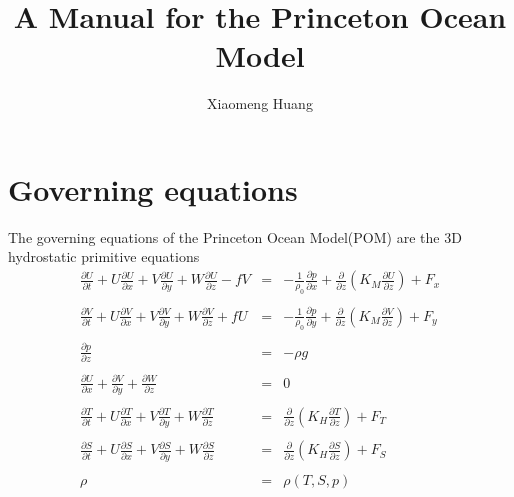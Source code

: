 \documentclass[oribibl]{llncs}
\begin{document}
\title{A Manual for the Princeton Ocean Model}
\author{Xiaomeng Huang}
\maketitle

\section{Governing equations}

The governing equations of the Princeton Ocean Model(POM) are the 3D hydrostatic primitive equations
\begin{eqnarray}
\frac{\partial U}{\partial t}+U\frac{\partial U}{\partial x}+V\frac{\partial U}{\partial y}+W\frac{\partial U}{\partial z} -fV &=& - \frac{1}{\rho_0} \frac{\partial p}{\partial x} + \frac{\partial}{\partial z}  \left ( K_M \frac{\partial U}{\partial z} \right) +F_x\\ \nonumber \\ 
\frac{\partial V}{\partial t}+U\frac{\partial V}{\partial x}+V\frac{\partial V}{\partial y}+W\frac{\partial V}{\partial z} +fU&=& - \frac{1}{\rho_0} \frac{\partial p}{\partial y} + \frac{\partial}{\partial z}  \left ( K_M \frac{\partial V}{\partial z} \right) +F_y\\ \nonumber \\ 
\frac{\partial p}{\partial z} &=& - \rho g \\ \nonumber \\ 
\frac{\partial U}{\partial x} + \frac{\partial V}{\partial y} + \frac{\partial W}{\partial z} &=& 0 \\ \nonumber \\ 
\frac{\partial T}{\partial t}+U\frac{\partial T}{\partial x}+V\frac{\partial T}{\partial y}+W\frac{\partial T}{\partial z} &=& \frac{\partial}{\partial z}  \left ( K_H \frac{\partial T}{\partial z} \right) +F_T \\ \nonumber \\ 
\frac{\partial S}{\partial t}+U\frac{\partial S}{\partial x}+V\frac{\partial S}{\partial y}+W\frac{\partial S}{\partial z} &=& \frac{\partial}{\partial z}  \left ( K_H \frac{\partial S}{\partial z} \right) +F_S\\ \nonumber \\ 
\rho &=& \rho(T,S,p)
\end{eqnarray}
\end{document}
